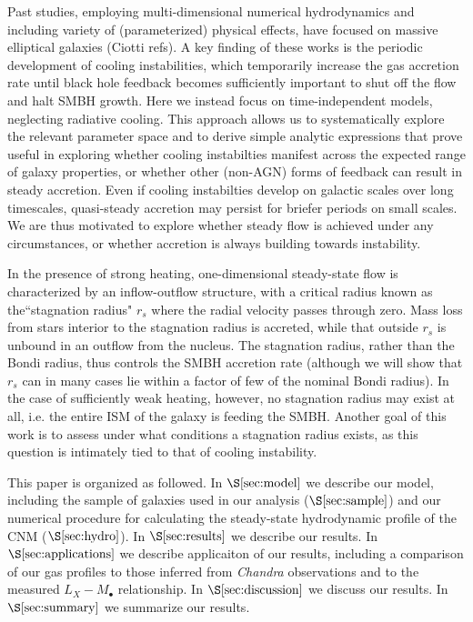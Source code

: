 \documentclass[usenatbib,fleqn]{mn2e}
\newcommand{\rs}{r_s}
\newcommand{\Mbh}[1][]{M_{\bullet#1}}
\begin{document}
Past studies, employing multi-dimensional numerical hydrodynamics and including variety of (parameterized) physical effects, have focused on massive elliptical galaxies (Ciotti refs).  A key finding of these works is the periodic development of cooling instabilities, which temporarily increase the gas accretion rate until black hole feedback becomes sufficiently important to shut off the flow and halt SMBH growth.  Here we instead focus on time-independent models, neglecting radiative cooling.  This approach allows us to systematically explore the relevant parameter space and to derive simple analytic expressions that prove useful in exploring whether cooling instabilties manifest across the expected range of galaxy properties, or whether other (non-AGN) forms of feedback can result in steady accretion.  Even if cooling instabilties develop on galactic scales over long timescales, quasi-steady accretion may persist for briefer periods on small scales.  We are thus motivated to explore whether steady flow is achieved under any circumstances, or whether accretion is always building towards instability.  

In the presence of strong heating, one-dimensional steady-state flow is characterized by an inflow-outflow structure, with a critical radius known as the``stagnation radius" $\rs$ where the radial velocity passes through zero.  Mass loss from stars interior to the stagnation radius is accreted, while that outside $\rs$ is unbound in an outflow from the nucleus.  The stagnation radius, rather than the Bondi radius, thus controls the SMBH accretion rate (although we will show that $\rs$ can in many cases lie within a factor of few of the nominal Bondi radius).  In the case of sufficiently weak heating, however, no stagnation radius may exist at all, i.e. the entire ISM of the galaxy is feeding the SMBH.  Another goal of this work is to assess under what conditions a stagnation radius exists, as this question is intimately tied to that of cooling instability.  


This paper is organized as followed.  In $\S\ref{sec:model}$ we
describe our model, including the sample of galaxies used in our
analysis ($\S\ref{sec:sample}$) and our numerical procedure for
calculating the steady-state hydrodynamic profile of the CNM
($\S\ref{sec:hydro}$).  In $\S\ref{sec:results}$ we describe our
results.  In $\S\ref{sec:applications}$ we describe applicaiton of our
results, including a comparison of our gas profiles to those inferred
from {\it Chandra} observations and to the measured $L_X-\Mbh$
relationship.  In $\S\ref{sec:discussion}$ we discuss our results.  In
$\S\ref{sec:summary}$ we summarize our results.
\end{document}
